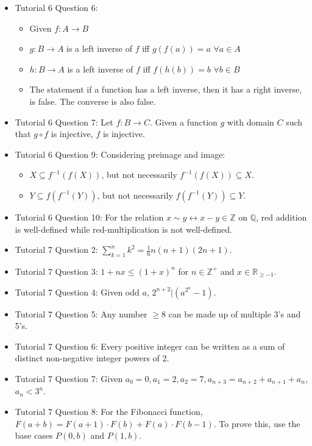 \documentclass[10pt, portrait]{article}
\begin{document}
\begin{multicols*}{2}
\begin{itemize}
    \item Tutorial 6 Question 6:
    \begin{itemize}
        \item Given $f : A \rightarrow B$
        \item $g : B \rightarrow A$ is a left inverse of $f$ iff  $g(f(a)) = a$ $\forall a \in A$
        \item $h : B \rightarrow A$ is a left inverse of $f$ iff  $f(h(b)) = b$ $\forall b \in B$
        \item The statement if a function has a left inverse, then it has a right inverse, is false. The converse is also false.
    \end{itemize}
    \item Tutorial 6 Question 7: Let $f : B \rightarrow C$. Given a function $g$ with domain $C$ such that $g \circ f$ is injective, $f$ is injective.
    \item Tutorial 6 Question 9: Considering preimage and image:
    \begin{itemize}
        \item $X \subseteq f^{-1}(f(X))$, but not necessarily $f^{-1}(f(X)) \subseteq X$.
        \item $Y \subseteq f(f^{-1}(Y))$, but not necessarily $f(f^{-1}(Y)) \subseteq Y$.
    \end{itemize}
    \item Tutorial 6 Question 10: For the relation $x \sim y \leftrightarrow x-y \in \mathbb{Z}$ on $\mathbb{Q}$, red addition is well-defined while red-multiplication is not well-defined.
    \item Tutorial 7 Question 2: $\sum_{k=1}^n k^2=\frac{1}{6}n(n+1)(2n+1)$.
    \item Tutorial 7 Question 3: $1+nx \leq (1+x)^n$ for $n \in \mathbb{Z}^+$ and $x \in \mathbb{R}_{\geq -1}$.
    \item Tutorial 7 Question 4: Given odd $a$, $2^{n+2} | (a^{2^n}-1)$.
    \item Tutorial 7 Question 5: Any number $\geq 8$ can be made up of multiple 3's and 5's.
    \item Tutorial 7 Question 6: Every positive integer can be written as a sum of distinct non-negative integer powers of 2.
    \item Tutorial 7 Question 7: Given $a_0=0, a_1=2, a_2=7, a_{n+3}=a_{n+2}+a_{n+1}+a_n$, $a_n < 3^n$.
    \item Tutorial 7 Question 8: For the Fibonacci function, $F(a+b)=F(a+1) \cdot F(b) + F(a) \cdot F(b-1)$. To prove this, use the base cases $P(0, b)$ and $P(1, b)$.

\end{itemize}
\end{multicols*}
\end{document}
